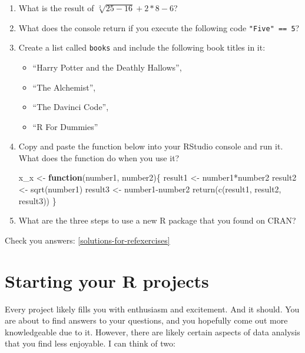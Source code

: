 \documentclass[
]{book}
\newenvironment{Shaded}{\begin{snugshade}}{\end{snugshade}}
\newcommand{\ControlFlowTok}[1]{\textcolor[rgb]{0.13,0.29,0.53}{\textbf{#1}}}
\newcommand{\FunctionTok}[1]{\textcolor[rgb]{0.00,0.00,0.00}{#1}}
\newcommand{\NormalTok}[1]{#1}
\newcommand{\OtherTok}[1]{\textcolor[rgb]{0.56,0.35,0.01}{#1}}
\newcommand{\SpecialCharTok}[1]{\textcolor[rgb]{0.00,0.00,0.00}{#1}}
\begin{document}
\begin{enumerate}
\def\labelenumi{\arabic{enumi}.}
\item
  What is the result of \(\sqrt[2]{25-16}+2*8-6\)?
\item
  What does the console return if you execute the following code \texttt{"Five"\ ==\ 5}?
\item
  Create a list called \texttt{books} and include the following book titles in it:

  \begin{itemize}
  \item
    ``Harry Potter and the Deathly Hallows'',
  \item
    ``The Alchemist'',
  \item
    ``The Davinci Code'',
  \item
    ``R For Dummies''
  \end{itemize}
\item
  Copy and paste the function below into your RStudio console and run it. What does the function do when you use it?

\begin{Shaded}
\begin{Highlighting}[]
\NormalTok{x\_x }\OtherTok{\textless{}{-}} \ControlFlowTok{function}\NormalTok{(number1, number2)\{}
\NormalTok{  result1 }\OtherTok{\textless{}{-}}\NormalTok{ number1}\SpecialCharTok{*}\NormalTok{number2}
\NormalTok{  result2 }\OtherTok{\textless{}{-}} \FunctionTok{sqrt}\NormalTok{(number1)}
\NormalTok{  result3 }\OtherTok{\textless{}{-}}\NormalTok{ number1}\SpecialCharTok{{-}}\NormalTok{number2}
  \FunctionTok{return}\NormalTok{(}\FunctionTok{c}\NormalTok{(result1, result2, result3))}
\NormalTok{\} }
\end{Highlighting}
\end{Shaded}
\item
  What are the three steps to use a new R package that you found on CRAN?
\end{enumerate}

Check you answers: \ref{solutions-for-refexercises}

\hypertarget{starting-your-r-projects}{%
\chapter{Starting your R projects}\label{starting-your-r-projects}}

Every project likely fills you with enthusiasm and excitement. And it should. You are about to find answers to your questions, and you hopefully come out more knowledgeable due to it. However, there are likely certain aspects of data analysis that you find less enjoyable. I can think of two:
\end{document}
